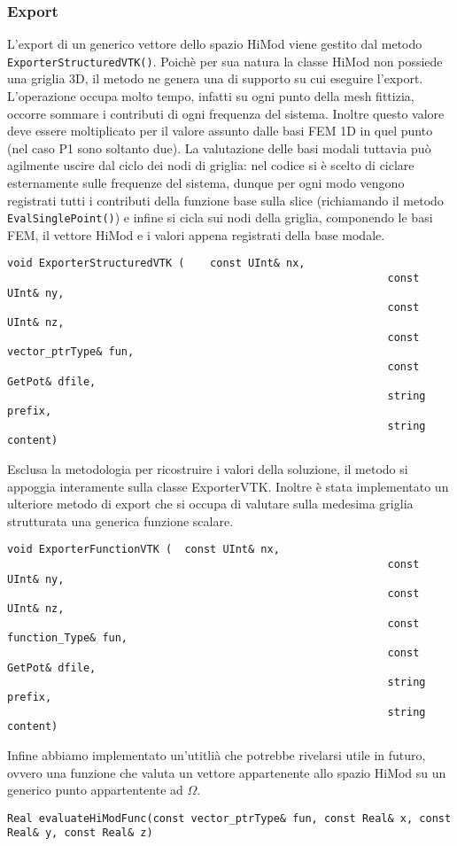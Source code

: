 \subsubsection{Export}

L'export di un generico vettore dello spazio HiMod viene gestito dal metodo \texttt{ExporterStructuredVTK()}. Poich\`e  per sua natura la classe HiMod non possiede una griglia 3D,  il metodo ne genera una di supporto su cui eseguire l'export. 
L'operazione occupa molto tempo, infatti su ogni punto della mesh fittizia, occorre sommare i contributi di ogni frequenza del sistema. Inoltre questo valore deve essere moltiplicato per il valore assunto dalle basi FEM 1D in quel punto (nel caso P1 sono soltanto due). La valutazione delle basi modali tuttavia pu\`o agilmente uscire dal ciclo dei nodi di griglia: nel codice si \`e scelto di ciclare esternamente sulle frequenze del sistema, dunque per ogni modo vengono registrati tutti i contributi della funzione base sulla slice (richiamando il metodo \texttt{EvalSinglePoint()}) e infine si cicla sui nodi della griglia, componendo le basi FEM, il vettore HiMod e i valori appena registrati della base modale.

\begin{lstlisting}[style = general,frame=none]
void ExporterStructuredVTK (	const UInt& nx,
															const UInt& ny,
															const UInt& nz,
															const vector_ptrType& fun,
															const GetPot& dfile, 
															string prefix,
															string content)
\end{lstlisting}

Esclusa la metodologia per ricostruire i valori della soluzione, il metodo si appoggia interamente sulla classe ExporterVTK.
Inoltre \`e stata implementato un ulteriore metodo di export che si occupa di valutare sulla medesima griglia strutturata una generica funzione scalare.

\begin{lstlisting}[style = general,frame=none]
void ExporterFunctionVTK (	const UInt& nx,
															const UInt& ny,
															const UInt& nz,
															const function_Type& fun,
															const GetPot& dfile, 
															string prefix,
															string content)
\end{lstlisting}

Infine abbiamo implementato un'utitli\`a che potrebbe rivelarsi utile in futuro, ovvero una funzione che valuta un vettore appartenente allo spazio HiMod  su un generico punto appartentente ad $\Omega$.

\begin{lstlisting}[style = general,frame=none]
Real evaluateHiModFunc(const vector_ptrType& fun, const Real& x, const Real& y, const Real& z)
\end{lstlisting}